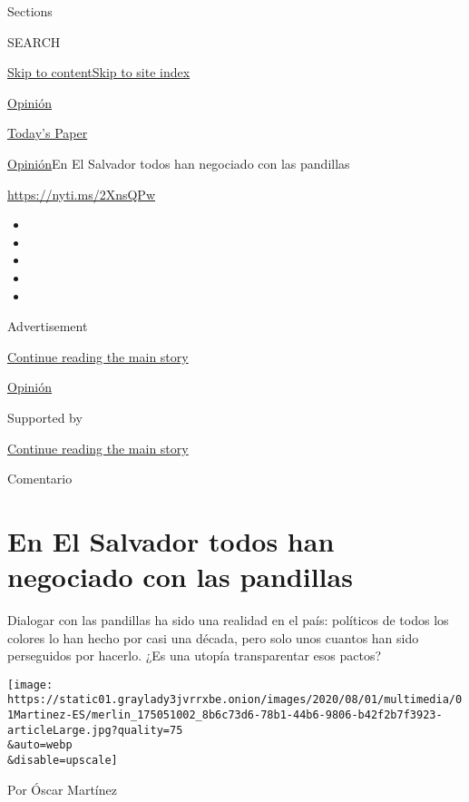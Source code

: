 Sections

SEARCH

\protect\hyperlink{site-content}{Skip to
content}\protect\hyperlink{site-index}{Skip to site index}

\href{https://www.nytimes3xbfgragh.onion/es/section/opinion}{Opinión}

\href{https://myaccount.nytimes3xbfgragh.onion/auth/login?response_type=cookie\&client_id=vi}{}

\href{https://www.nytimes3xbfgragh.onion/section/todayspaper}{Today's
Paper}

\href{/es/section/opinion}{Opinión}\textbar{}En El Salvador todos han
negociado con las pandillas

\url{https://nyti.ms/2XnsQPw}

\begin{itemize}
\item
\item
\item
\item
\item
\end{itemize}

Advertisement

\protect\hyperlink{after-top}{Continue reading the main story}

\href{/es/section/opinion}{Opinión}

Supported by

\protect\hyperlink{after-sponsor}{Continue reading the main story}

Comentario

\hypertarget{en-el-salvador-todos-han-negociado-con-las-pandillas}{%
\section{En El Salvador todos han negociado con las
pandillas}\label{en-el-salvador-todos-han-negociado-con-las-pandillas}}

Dialogar con las pandillas ha sido una realidad en el país: políticos de
todos los colores lo han hecho por casi una década, pero solo unos
cuantos han sido perseguidos por hacerlo. ¿Es una utopía transparentar
esos pactos?

\texttt{[image: https://static01.graylady3jvrrxbe.onion/images/2020/08/01/multimedia/01Martinez-ES/merlin\_175051002\_8b6c73d6-78b1-44b6-9806-b42f2b7f3923-articleLarge.jpg?quality=75\\\&auto=webp\\\&disable=upscale]}

Por Óscar Martínez

